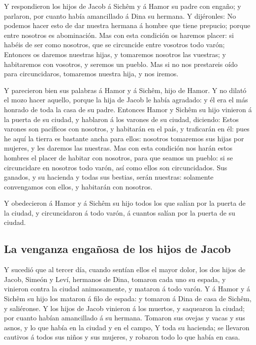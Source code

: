  Y respondieron los hijos de Jacob á Sichêm y á Hamor su
padre con engaño; y parlaron, por cuanto había amancillado á Dina su
hermana.  Y dijéronles: No podemos hacer esto de dar
nuestra hermana á hombre que tiene prepucio; porque entre nosotros es
abominación.  Mas con esta condición os haremos placer:
si habéis de ser como nosotros, que se circuncide entre vosotros todo
varón;  Entonces os daremos nuestras hijas, y tomaremos
nosotros las vuestras; y habitaremos con vosotros, y seremos un pueblo.
 Mas si no nos prestareis oído para circuncidaros,
tomaremos nuestra hija, y nos iremos.

 Y parecieron bien sus palabras á Hamor y á Sichêm, hijo
de Hamor.  Y no dilató el mozo hacer aquello, porque la
hija de Jacob le había agradado: y él era el más honrado de toda la casa
de su padre.  Entonces Hamor y Sichêm su hijo vinieron á
la puerta de su ciudad, y hablaron á los varones de su ciudad, diciendo:
 Estos varones son pacíficos con nosotros, y habitarán en
el país, y traficarán en él: pues he aquí la tierra es bastante ancha
para ellos: nosotros tomaremos sus hijas por mujeres, y les daremos las
nuestras.  Mas con esta condición nos harán estos hombres
el placer de habitar con nosotros, para que seamos un pueblo: si se
circuncidare en nosotros todo varón, así como ellos son circuncidados.
 Sus ganados, y su hacienda y todas sus bestias, serán
nuestras: solamente convengamos con ellos, y habitarán con nosotros.

 Y obedecieron á Hamor y á Sichêm su hijo todos los que
salían por la puerta de la ciudad, y circuncidaron á todo varón, á
cuantos salían por la puerta de su ciudad.

\hypertarget{la-venganza-engauxf1osa-de-los-hijos-de-jacob}{%
\subsection{La venganza engañosa de los hijos de
Jacob}\label{la-venganza-engauxf1osa-de-los-hijos-de-jacob}}

 Y sucedió que al tercer día, cuando sentían ellos el
mayor dolor, los dos hijos de Jacob, Simeón y Leví, hermanos de Dina,
tomaron cada uno su espada, y vinieron contra la ciudad animosamente, y
mataron á todo varón.  Y á Hamor y á Sichêm su hijo los
mataron á filo de espada: y tomaron á Dina de casa de Sichêm, y
saliéronse.  Y los hijos de Jacob vinieron á los muertos,
y saquearon la ciudad; por cuanto habían amancillado á su hermana.
 Tomaron sus ovejas y vacas y sus asnos, y lo que había
en la ciudad y en el campo,  Y toda su hacienda; se
llevaron cautivos á todos sus niños y sus mujeres, y robaron todo lo que
había en casa.

